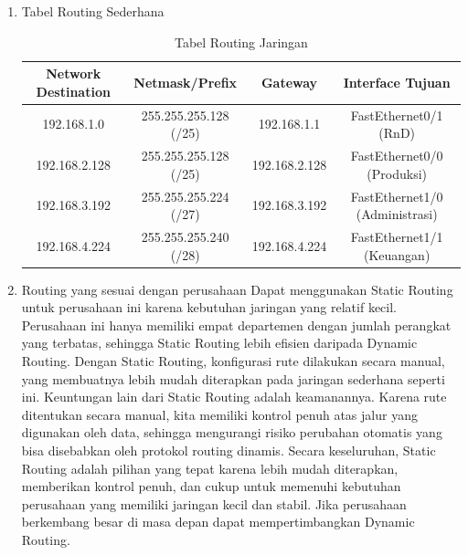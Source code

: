 \begin{enumerate}
	\item Tabel Routing Sederhana
\begin{table}[h]
    \centering
    \caption{Tabel Routing Jaringan}
    \label{tab:tabel_routing}
    \begin{tabular}{|c|c|c|c|}
    \hline
    \textbf{Network Destination} & \textbf{Netmask/Prefix} & \textbf{Gateway} & \textbf{Interface Tujuan} \\
    \hline
 	192.168.1.0 & 255.255.255.128 (/25) & 192.168.1.1 & FastEthernet0/1 (RnD) \\
    192.168.2.128 & 255.255.255.128 (/25) & 192.168.2.128 & FastEthernet0/0 (Produksi) \\
    192.168.3.192 & 255.255.255.224 (/27) & 192.168.3.192 & FastEthernet1/0 (Administrasi) \\
    192.168.4.224 & 255.255.255.240 (/28) & 192.168.4.224 & FastEthernet1/1 (Keuangan) \\
    \hline
    \end{tabular}
\end{table}
\item Routing yang sesuai dengan perusahaan
Dapat menggunakan Static Routing untuk perusahaan ini karena kebutuhan jaringan yang relatif kecil. Perusahaan ini hanya memiliki empat departemen dengan jumlah perangkat yang terbatas, sehingga Static Routing lebih efisien daripada Dynamic Routing. Dengan Static Routing, konfigurasi rute dilakukan secara manual, yang membuatnya lebih mudah diterapkan pada jaringan sederhana seperti ini.
Keuntungan lain dari Static Routing adalah keamanannya. Karena rute ditentukan secara manual, kita memiliki kontrol penuh atas jalur yang digunakan oleh data, sehingga mengurangi risiko perubahan otomatis yang bisa disebabkan oleh protokol routing dinamis.
Secara keseluruhan, Static Routing adalah pilihan yang tepat karena lebih mudah diterapkan, memberikan kontrol penuh, dan cukup untuk memenuhi kebutuhan perusahaan yang memiliki jaringan kecil dan stabil. Jika perusahaan berkembang besar di masa depan dapat mempertimbangkan Dynamic Routing.
\end{enumerate}